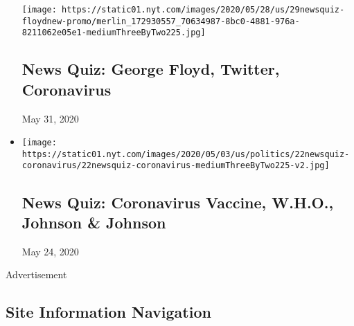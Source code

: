 \begin{itemize}
  \texttt{[image: https://static01.nyt.com/images/2020/05/28/us/29newsquiz-floydnew-promo/merlin\_172930557\_70634987-8bc0-4881-976a-8211062e05e1-mediumThreeByTwo225.jpg]}

  \hypertarget{news-quiz-george-floyd-twitter-coronavirus}{%
  \subsection{News Quiz: George Floyd, Twitter,
  Coronavirus}\label{news-quiz-george-floyd-twitter-coronavirus}}

  May 31, 2020
\item
  \href{https://www.nytimes.com/interactive/2020/05/22/briefing/coronavirus-vaccine-world-health-organization-johnson-and-johnson.html}{}

  \texttt{[image: https://static01.nyt.com/images/2020/05/03/us/politics/22newsquiz-coronavirus/22newsquiz-coronavirus-mediumThreeByTwo225-v2.jpg]}

  \hypertarget{news-quiz-coronavirus-vaccine-who-johnson--johnson}{%
  \subsection{News Quiz: Coronavirus Vaccine, W.H.O., Johnson \&
  Johnson}\label{news-quiz-coronavirus-vaccine-who-johnson--johnson}}

  May 24, 2020
\end{itemize}

Advertisement

\hypertarget{site-information-navigation}{%
\subsection{Site Information
Navigation}\label{site-information-navigation}}

